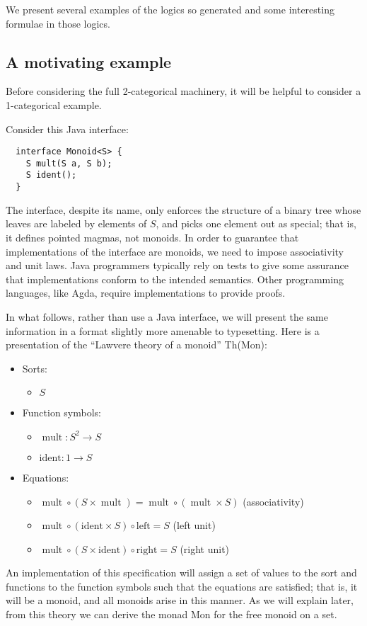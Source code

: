 \documentclass{article}
\newcommand{\maps}{\colon}
\renewcommand{\left}{\mathrm{left}}
\renewcommand{\right}{\mathrm{right}}
\newcommand{\mult}{\mathop{\mathrm{mult}}}
\newcommand{\ident}{\mathrm{ident}}
\begin{document}
We present several examples of the logics so generated and some interesting formulae in those logics.

\subsection{A motivating example}

Before considering the full 2-categorical machinery, it will be helpful to consider a 1-categorical example.

Consider this Java interface:
\begin{verbatim}
  interface Monoid<S> {
    S mult(S a, S b);
    S ident();
  }
\end{verbatim}
The interface, despite its name, only enforces the structure of a binary tree whose leaves are labeled by elements of $S$, and picks one element out as special; that is, it defines pointed magmas, not monoids.  In order to guarantee that implementations of the interface are monoids, we need to impose associativity and unit laws.  Java programmers typically rely on tests to give some assurance that implementations conform to the intended semantics.  Other programming languages, like Agda, require implementations to provide proofs.

In what follows, rather than use a Java interface, we will present the same information in a format slightly more amenable to typesetting.  Here is a presentation of the ``Lawvere theory of a monoid'' Th(Mon):\\
\begin{center}
  \begin{itemize}
    \item Sorts:
    \begin{itemize}
      \item $S$
    \end{itemize}
    \item Function symbols:
    \begin{itemize}
      \item $\mult\maps S^2 \to S$
      \item $\ident\maps 1 \to S$
    \end{itemize}
    \item Equations:
    \begin{itemize}
      \item $\mult \circ (S \times \mult) = \mult \circ (\mult \times S)$ (associativity)
      \item $\mult \circ (\ident \times S) \circ \left = S$ (left unit)
      \item $\mult \circ (S \times \ident) \circ \right = S$ (right unit)        
    \end{itemize}
  \end{itemize}
\end{center}
An implementation of this specification will assign a set of values to the sort and functions to the function symbols such that the equations are satisfied; that is, it will be a monoid, and all monoids arise in this manner.  As we will explain later, from this theory we can derive the monad Mon for the free monoid on a set.
\end{document}

